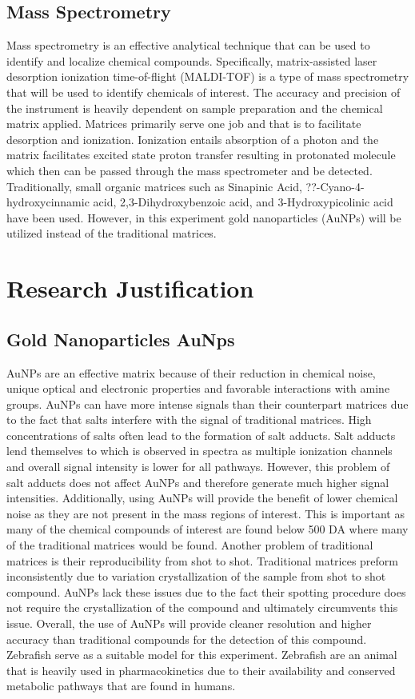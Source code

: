 \documentclass{article}\usepackage[]{graphicx}\usepackage[]{color}
\begin{document}
\subsection{Mass Spectrometry}
Mass spectrometry is an effective analytical technique that can be used to identify and localize chemical compounds. Specifically, matrix-assisted laser desorption ionization time-of-flight (MALDI-TOF) is a type of mass spectrometry that will be used to identify chemicals of interest.  The accuracy and precision of the instrument is heavily dependent on sample preparation and the chemical matrix applied. Matrices primarily serve one job and that is to facilitate desorption and ionization. Ionization entails absorption of  a photon  and the matrix facilitates excited state proton transfer resulting in protonated molecule which then can be passed through the mass spectrometer and be detected. Traditionally, small organic matrices such as Sinapinic Acid,  ??-Cyano-4-hydroxycinnamic acid, 2,3-Dihydroxybenzoic acid, and 3-Hydroxypicolinic acid have been used. However, in this experiment gold nanoparticles (AuNPs) will be utilized instead of the traditional matrices.
	
\section{Research Justification}
\subsection{Gold Nanoparticles AuNps}
AuNPs are an effective matrix because of their reduction in chemical noise, unique optical and electronic properties and  favorable interactions with amine groups\cite{mclean2005size}. AuNPs can have more intense signals than their counterpart matrices due to the fact that salts interfere with the signal of traditional matrices. High concentrations of salts often lead to the formation of salt adducts. Salt adducts lend themselves to which is observed in spectra as multiple ionization channels and overall signal intensity is lower for all pathways. However, this problem of salt adducts does not affect AuNPs and therefore generate much higher signal intensities\cite{wu2009gold}. Additionally, using AuNPs will provide the benefit of lower chemical noise as they are not present in the mass regions of interest. This is important as many of the chemical compounds of interest are found below 500 DA where many of the traditional matrices would be found. Another problem of traditional matrices is their reproducibility from shot to shot. Traditional matrices preform inconsistently due to variation crystallization of the sample from shot to shot compound. AuNPs lack these issues due to the fact their spotting procedure does not require the crystallization of the compound and ultimately circumvents this issue. 
Overall, the use of AuNPs will provide cleaner resolution and higher accuracy than traditional compounds for the detection of this compound.
Zebrafish serve as a suitable model for this experiment. Zebrafish are an animal that is heavily used in pharmacokinetics due to their availability and conserved metabolic pathways that are found in humans. 
\end{document}
